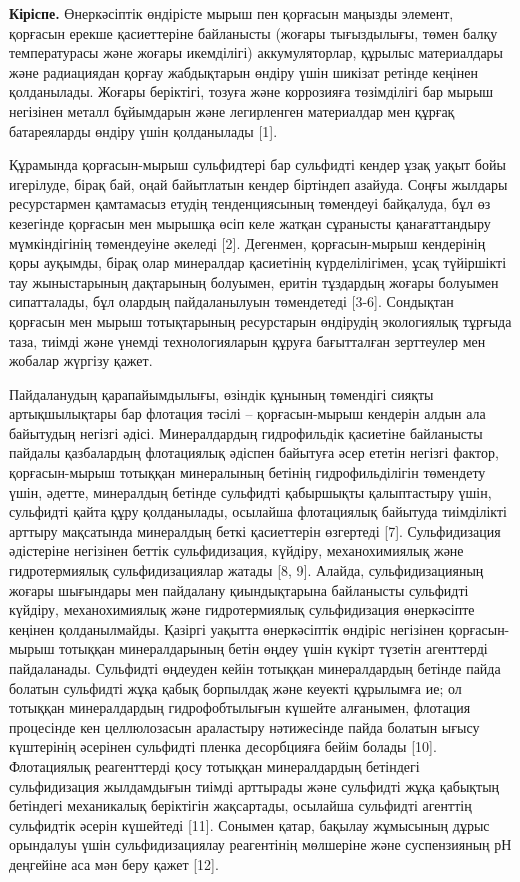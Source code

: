 \begin{multicols}{2}
{\bfseries Кіріспе.} Өнеркәсіптік өндірісте мырыш пен қорғасын маңызды
элемент, қорғасын ерекше қасиеттеріне байланысты (жоғары тығыздылығы,
төмен балқу температурасы және жоғары икемділігі) аккумуляторлар,
құрылыс материалдары және радиациядан қорғау жабдықтарын өндіру үшін
шикізат ретінде кеңінен қолданылады. Жоғары беріктігі, тозуға және
коррозияға төзімділігі бар мырыш негізінен металл бұйымдарын және
легирленген материалдар мен құрғақ батареяларды өндіру үшін қолданылады
{[}1{]}.

Құрамында қорғасын-мырыш сульфидтері бар сульфидті кендер ұзақ уақыт
бойы игерілуде, бірақ бай, оңай байытлатын кендер біртіндеп азайуда.
Соңғы жылдары ресурстармен қамтамасыз етудің тенденциясының төмендеуі
байқалуда, бұл өз кезегінде қорғасын мен мырышқа өсіп келе жатқан
сұранысты қанағаттандыру мүмкіндігінің төмендеуіне әкеледі {[}2{]}.
Дегенмен, қорғасын-мырыш кендерінің қоры ауқымды, бірақ олар минералдар
қасиетінің күрделілігімен, ұсақ түйіршікті тау жыныстарының дақтарының
болуымен, еритін тұздардың жоғары болуымен сипатталады, бұл олардың
пайдаланылуын төмендетеді {[}3-6{]}. Сондықтан қорғасын мен мырыш
тотықтарының ресурстарын өндірудің экологиялық тұрғыда таза, тиімді және
үнемді технологияларын құруға бағытталған зерттеулер мен жобалар жүргізу
қажет.

Пайдаланудың қарапайымдылығы, өзіндік құнының төмендігі сияқты
артықшылықтары бар флотация тәсілі -- қорғасын-мырыш кендерін алдын ала
байытудың негізгі әдісі. Минералдардың гидрофильдік қасиетіне байланысты
пайдалы қазбалардың флотациялық әдіспен байытуға әсер ететін негізгі
фактор, қорғасын-мырыш тотыққан минералының бетінің гидрофильділігін
төмендету үшін, әдетте, минералдың бетінде сульфидті қабыршықты
қалыптастыру үшін, сульфидті қайта құру қолданылады, осылайша
флотациялық байытуда тиімділікті арттыру мақсатында минералдың беткі
қасиеттерін өзгертеді {[}7{]}. Сульфидизация әдістеріне негізінен беттік
сульфидизация, күйдіру, механохимиялық және гидротермиялық
сульфидизациялар жатады {[}8, 9{]}. Алайда, сульфидизацияның жоғары
шығындары мен пайдалану қиындықтарына байланысты сульфидті күйдіру,
механохимиялық және гидротермиялық сульфидизация өнеркәсіпте кеңінен
қолданылмайды. Қазіргі уақытта өнеркәсіптік өндіріс негізінен
қорғасын-мырыш тотыққан минералдарының бетін өңдеу үшін күкірт түзетін
агенттерді пайдаланады. Сульфидті өңдеуден кейін тотыққан минералдардың
бетінде пайда болатын сульфидті жұқа қабық борпылдақ және кеуекті
құрылымға ие; ол тотыққан минералдардың гидрофобтылығын күшейте
алғанымен, флотация процесінде кен целлюлозасын араластыру нәтижесінде
пайда болатын ығысу күштерінің әсерінен сульфидті пленка десорбцияға
бейім болады {[}10{]}. Флотациялық реагенттерді қосу тотыққан
минералдардың бетіндегі сульфидизация жылдамдығын тиімді арттырады және
сульфидті жұқа қабықтың бетіндегі механикалық беріктігін жақсартады,
осылайша сульфидті агенттің сульфидтік әсерін күшейтеді {[}11{]}.
Сонымен қатар, бақылау жұмысының дұрыс орындалуы үшін сульфидизациялау
реагентінің мөлшеріне және суспензияның рН деңгейіне аса мән беру қажет
{[}12{]}.
\end{multicols}

